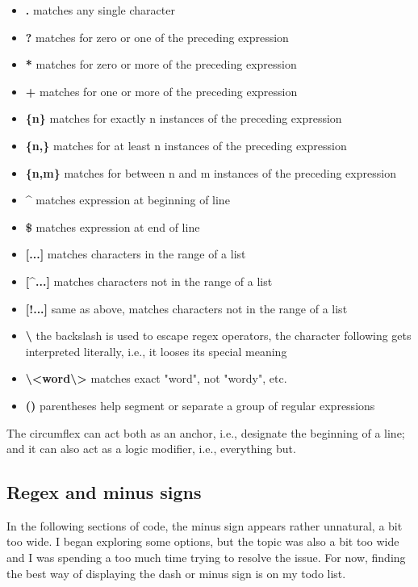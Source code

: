\begin{itemize}
	\item[] \textbf{.}    matches any single character
	\item[] \textbf{?}    matches for zero or one of the preceding expression
	\item[] \textbf{*}    matches for zero or more of the preceding expression
	\item[] \textbf{+}    matches for one or more of the preceding expression
	\item[] \textbf{\{n\}}  matches for exactly n instances of the preceding expression
	\item[] \textbf{\{n,\}}  matches for at least n instances of the preceding expression	
	\item[] \textbf{\{n,m\}}  matches for between n and m instances of the preceding expression
	\item[] \textbf{\textasciicircum{}} matches expression at beginning of line
	\item[] \textbf{\$}  matches expression at end of line
	\item[] \textbf{[...]} matches characters in the range of a list		
	\item[] \textbf{[\textasciicircum{}...]} matches characters not in the range of a list	
	\item[] \textbf{[!...]} same as above, matches characters not in the range of a list
	\item[] \textbf{\textbackslash{}} the backslash is used to escape regex operators, the character following gets interpreted literally, i.e., it looses its special meaning
	\item[] \textbf{\textbackslash{}<word\textbackslash{}>} matches exact "word", not "wordy", etc.
	\item[] \textbf{()} parentheses help segment or separate a group of regular expressions
\end{itemize}

The circumflex can act both as an anchor, i.e., designate the beginning of a line; and it can also act as a logic modifier, i.e., everything but.

\subsection{Regex and minus signs}

In the following sections of code, the minus sign appears rather unnatural, a bit too wide. I began exploring some options, but the topic was also a bit too wide and I was spending a too much time trying to resolve the issue. For now, finding the best way of displaying the dash or minus sign is on my todo list.


